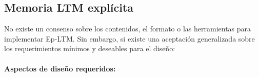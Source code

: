 \subsection{Memoria LTM explícita}\label{sec:ltm_exp}




No existe un consenso sobre los contenidos, el formato o las herramientas para implementar Ep-LTM.
Sin embargo, si existe una aceptación generalizada sobre los requerimientos mínimos y deseables para el diseño\cite{Vijayakumar2014, Ho2009,  Stachowicz2012, Jockel2008}:


\paragraph{Aspectos de diseño requeridos:}



